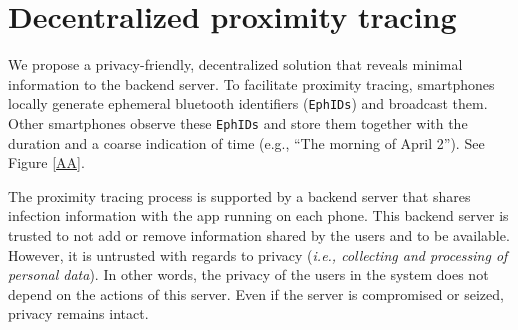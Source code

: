 \documentclass[12pt,a4paper]{article}
\begin{document}
\section*{Decentralized proximity tracing}
We propose a privacy-friendly, decentralized solution that reveals minimal information to the backend server. To facilitate proximity tracing, smartphones locally generate ephemeral bluetooth identifiers (\texttt{EphIDs}) and broadcast them. Other smartphones observe these \texttt{EphIDs} and store them together with the duration and a coarse indication of time (e.g., “The morning of April 2”). See Figure \ref{AA}.

The proximity tracing process is supported by a backend server that shares infection
information with the app running on each phone. This backend server is trusted to not add or remove information shared by the users and to be available. However, it is untrusted with regards to privacy (\textit{i.e., collecting and processing of personal data}). In other words, the privacy of the users in the system does not depend on the actions of this server. Even if the server is compromised or seized, privacy remains intact.
\end{document}
